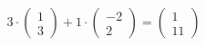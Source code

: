 \documentclass[preview]{standalone}
\begin{document}
\begin{align*}
3\cdot\begin{pmatrix}1 \\ 3\end{pmatrix} + 1\cdot\begin{pmatrix}-2 \\ 2\end{pmatrix} = \begin{pmatrix}1 \\ 11\end{pmatrix}
\end{align*}
\end{document}
